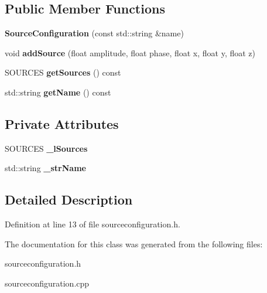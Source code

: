 \subsection*{Public Member Functions}
\begin{DoxyCompactItemize}
\item 
{\bfseries Source\-Configuration} (const std\-::string \&name)\label{classSoundfieldViewer_1_1SourceConfiguration_ab82fe63da70f05cbfcef1c4310990566}

\item 
void {\bfseries add\-Source} (float amplitude, float phase, float x, float y, float z)\label{classSoundfieldViewer_1_1SourceConfiguration_ad0a1b734c123428f81568343df6eb860}

\item 
S\-O\-U\-R\-C\-E\-S {\bfseries get\-Sources} () const \label{classSoundfieldViewer_1_1SourceConfiguration_a2cea951ade41c9a526aee70240b9dbdc}

\item 
std\-::string {\bfseries get\-Name} () const \label{classSoundfieldViewer_1_1SourceConfiguration_a721619d07e3ef119b45e1388055e201b}

\end{DoxyCompactItemize}
\subsection*{Private Attributes}
\begin{DoxyCompactItemize}
\item 
S\-O\-U\-R\-C\-E\-S {\bfseries \-\_\-l\-Sources}\label{classSoundfieldViewer_1_1SourceConfiguration_a705de4f5121a2bef871ab35bcd550019}

\item 
std\-::string {\bfseries \-\_\-str\-Name}\label{classSoundfieldViewer_1_1SourceConfiguration_a9fbc1fea44ca77724b98c92f43681d96}

\end{DoxyCompactItemize}


\subsection{Detailed Description}


Definition at line 13 of file sourceconfiguration.\-h.



The documentation for this class was generated from the following files\-:\begin{DoxyCompactItemize}
\item 
sourceconfiguration.\-h\item 
sourceconfiguration.\-cpp\end{DoxyCompactItemize}
